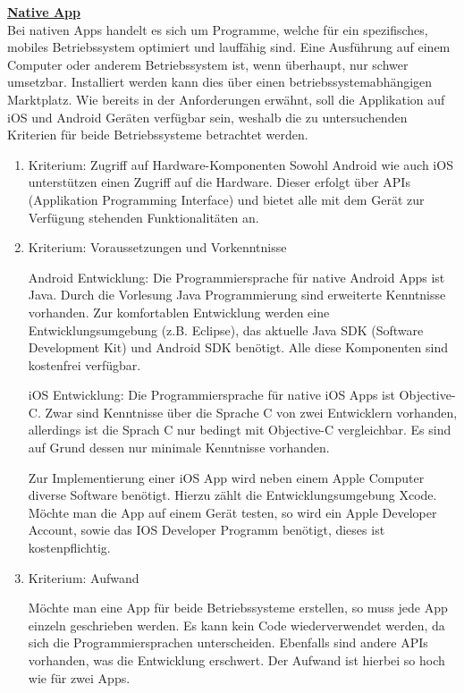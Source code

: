 


\textbf{\underline{Native App}}\\
Bei nativen Apps handelt es sich um Programme, welche für ein spezifisches, mobiles 
Betriebssystem optimiert und lauffähig sind. Eine Ausführung auf einem Computer oder anderem 
Betriebssystem ist, wenn überhaupt, nur schwer umsetzbar.
Installiert werden kann dies über einen betriebssystemabhängigen Marktplatz. Wie 
bereits in der Anforderungen erwähnt, soll die Applikation auf iOS und Android 
Geräten verfügbar sein, weshalb die zu untersuchenden Kriterien für beide 
Betriebssysteme betrachtet werden.

\begin{enumerate}
\item Kriterium: Zugriff auf Hardware-Komponenten
Sowohl Android wie auch iOS unterstützen einen Zugriff auf die Hardware. 
Dieser erfolgt über APIs (Applikation Programming Interface) und bietet alle mit 
dem Gerät zur Verfügung stehenden Funktionalitäten an.

\item Kriterium: Voraussetzungen und Vorkenntnisse

Android Entwicklung:
Die Programmiersprache für native Android Apps ist Java. Durch die Vorlesung Java 
Programmierung sind erweiterte Kenntnisse vorhanden. Zur komfortablen Entwicklung 
werden eine Entwicklungsumgebung (z.B. Eclipse), das aktuelle Java SDK (Software 
Development Kit) und Android SDK benötigt. Alle diese Komponenten sind kostenfrei 
verfügbar.

iOS Entwicklung:
Die Programmiersprache für native iOS Apps ist Objective-C. Zwar sind Kenntnisse 
über die Sprache C von zwei Entwicklern vorhanden, allerdings ist die Sprach C nur 
bedingt mit Objective-C vergleichbar. Es sind auf Grund dessen nur minimale 
Kenntnisse vorhanden.

Zur Implementierung einer iOS App wird neben einem Apple Computer diverse Software 
benötigt. Hierzu zählt die Entwicklungsumgebung Xcode. Möchte man die App auf einem 
Gerät testen, so wird ein Apple Developer Account, sowie das IOS Developer Programm benötigt, 
dieses ist kostenpflichtig.



\item Kriterium: Aufwand

Möchte man eine App für beide Betriebssysteme erstellen, so muss jede App einzeln 
geschrieben werden. Es kann kein Code wiederverwendet werden, da sich die 
Programmiersprachen unterscheiden. Ebenfalls sind andere APIs vorhanden, was die 
Entwicklung erschwert. Der Aufwand ist hierbei so hoch wie für zwei Apps. 
\end{enumerate}

